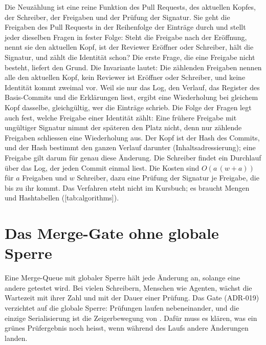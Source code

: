 Die Neuzählung ist eine reine Funktion des Pull Requests, des aktuellen Kopfes, der Schreiber,
der Freigaben und der Prüfung der Signatur.
Sie geht die Freigaben des Pull Requests in der Reihenfolge der Einträge durch
und stellt jeder dieselben Fragen in fester Folge:
Steht die Freigabe nach der Eröffnung, nennt sie den aktuellen Kopf, ist der Reviewer Eröffner
oder Schreiber, hält die Signatur, und zählt die Identität schon?
Die erste Frage, die eine Freigabe nicht besteht, liefert den Grund.
Die Invariante lautet: Die zählenden Freigaben nennen alle den aktuellen Kopf, kein Reviewer ist
Eröffner oder Schreiber, und keine Identität kommt zweimal vor.
Weil sie nur das Log, den Verlauf, das Register des Basis-Commits und die Erklärungen liest,
ergibt eine Wiederholung bei gleichem Kopf dasselbe, gleichgültig, wer die Einträge schrieb.
Die Folge der Fragen legt auch fest, welche Freigabe einer Identität zählt:
Eine frühere Freigabe mit ungültiger Signatur nimmt der späteren den Platz nicht,
denn nur zählende Freigaben schliessen eine Wiederholung aus.
Der Kopf ist der Hash des Commits, und der Hash bestimmt den ganzen Verlauf darunter
(Inhaltsadressierung); eine Freigabe gilt darum für genau diese Änderung.
Die Schreiber findet ein Durchlauf über das Log, der jeden Commit einmal liest.
Die Kosten sind $O(a\,(w+a))$ für $a$ Freigaben und $w$ Schreiber,
dazu eine Prüfung der Signatur je Freigabe, die bis zu ihr kommt.
Das Verfahren steht nicht im Kursbuch; es braucht Mengen und Hashtabellen
([tab:algorithms]).

\startplacefigure[title={Ablauf eines Pull Requests bis zur Zeigerbewegung von main},
    reference=fig:pull-request-flow,location=here]
\stopplacefigure

\section[sec:merge-gate]{Das Merge-Gate ohne globale Sperre}

Eine Merge-Queue mit globaler Sperre hält jede Änderung an, solange eine andere getestet wird.
Bei vielen Schreibern, Menschen wie Agenten, wächst die Wartezeit mit ihrer Zahl und mit der
Dauer einer Prüfung.
Das Gate (ADR-019) verzichtet auf die globale Sperre:
Prüfungen laufen nebeneinander, und die einzige Serialisierung ist die Zeigerbewegung von
.
Dafür muss es klären, was ein grünes Prüfergebnis noch heisst, wenn während des Laufs andere
Änderungen landen.

